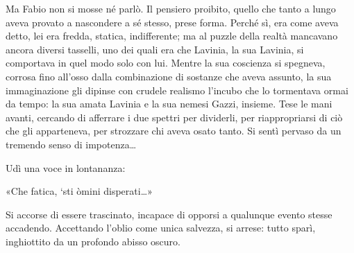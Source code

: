 Ma Fabio non si mosse né parlò. Il pensiero proibito, quello che tanto a lungo aveva provato a nascondere a sé stesso, prese forma. Perché sì, era come aveva detto, lei era fredda, statica, indifferente; ma al puzzle della realtà mancavano ancora diversi tasselli, uno dei quali era che Lavinia, la sua Lavinia, si comportava in quel modo solo con lui. Mentre la sua coscienza si spegneva, corrosa fino all'osso dalla combinazione di sostanze che aveva assunto, la sua immaginazione gli dipinse con crudele realismo l'incubo che lo tormentava ormai da tempo: la sua amata Lavinia e la sua nemesi Gazzi, insieme. Tese le mani avanti, cercando di afferrare i due spettri per dividerli, per riappropriarsi di ciò che gli apparteneva, per strozzare chi aveva osato tanto. Si sentì pervaso da un tremendo senso di impotenza\ldots

Udì una voce in lontananza:

«Che fatica, `sti òmini disperati\ldots»

Si accorse di essere trascinato, incapace di opporsi a qualunque evento stesse accadendo. Accettando l'oblio come unica salvezza, si arrese: tutto sparì, inghiottito da un profondo abisso oscuro.
